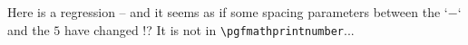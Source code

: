 \documentclass{article}
\begin{document}
	Here is a regression -- and it seems as if some spacing parameters between the `$-$` and the $5$ have changed !? It is not in \verb|\pgfmathprintnumber|...





\end{document}
